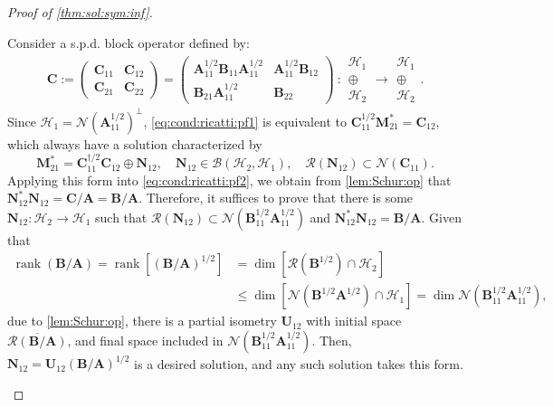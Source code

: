\documentclass[noinfoline]{imsart}\setcounter{tocdepth}{2}
\newcommand{\m}[1]{\mathbf{#1}} %
\renewcommand{\c}[1]{\mathcal{#1}} %
\DeclareMathOperator*{\rk}{rank}
\theoremstyle{plain}
\begin{document}
\begin{proof}[Proof of \cref{thm:sol:sym:inf}]
\begin{itemize}[leftmargin = *]
Consider a s.p.d. block operator defined by:
\begin{align}\label{eq:comp:block}
    \m{C} := \begin{pmatrix}
        \m{C}_{11} & \m{C}_{12} \\
        \m{C}_{21} & \m{C}_{22}
    \end{pmatrix} = \begin{pmatrix}
        \m{A}_{11}^{1/2} \m{B}_{11} \m{A}_{11}^{1/2} & \m{A}_{11}^{1/2} \m{B}_{12} \\
        \m{B}_{21} \m{A}_{11}^{1/2} & \m{B}_{22}
    \end{pmatrix}
    \    :
    \begin{array}{c}
    \c{H}_{1} \\
    \oplus \\
    \c{H}_{2}
    \end{array}
    \rightarrow
    \begin{array}{c}
    \c{H}_{1} \\
    \oplus \\
    \c{H}_{2}
    \end{array}.
\end{align}
Since $\c{H}_{1} = \c{N}(\m{A}_{11}^{1/2})^{\perp}$, \eqref{eq:cond:ricatti:pf1} is equivalent to $\m{C}_{11}^{1/2} \m{M}_{21}^{*} = \m{C}_{12}$, which always have a solution characterized by
\begin{equation*}
    \m{M}_{21}^{*} = \m{C}_{11}^{\dagger/2} \m{C}_{12} \oplus \m{N}_{12}, \quad \m{N}_{12} \in \c{B}(\c{H}_{2}, \c{H}_{1}), \quad \c{R}(\m{N}_{12}) \subset \c{N}(\m{C}_{11}).
\end{equation*}
Applying this form into \eqref{eq:cond:ricatti:pf2}, we obtain from \cref{lem:Schur:op} that $\m{N}_{12}^{*} \m{N}_{12} = \m{C}/\m{A} = \m{B}/\m{A}$.
Therefore, it suffices to prove that there is some $\m{N}_{12}: \c{H}_{2} \rightarrow \c{H}_{1}$ such that $\c{R}(\m{N}_{12}) \subset \c{N} (\m{B}_{11}^{1/2} \m{A}_{11}^{1/2})$ and $\m{N}_{12}^{*} \m{N}_{12} = \m{B}/\m{A}$. Given that
\begin{align*}
    \rk (\m{B} / \m{A}) = \rk [(\m{B} / \m{A})^{1/2}] &= \dim [\c{R}(\m{B}^{1/2}) \cap \c{H}_{2}] \\
    &\le \dim [\c{N}(\m{B}^{1/2} \m{A}^{1/2}) \cap \c{H}_{1}] = \dim \c{N} (\m{B}_{11}^{1/2} \m{A}_{11}^{1/2}),
\end{align*}
due to \cref{lem:Schur:op}, there is a partial isometry $\m{U}_{12}$ with initial space $\overline{\c{R}(\m{B}/\m{A})}$, and final space included in $\c{N}(\m{B}_{11}^{1/2} \m{A}_{11}^{1/2})$. Then, $\m{N}_{12} = \m{U}_{12} (\m{B}/\m{A})^{1/2}$ is a desired solution, and any such solution takes this form.
\end{itemize}
\end{proof}
\end{document}
